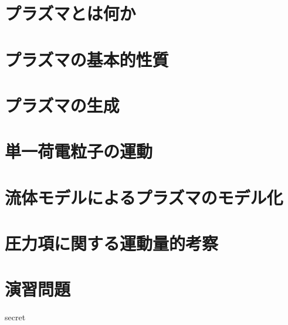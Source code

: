 \documentclass{report}
\begin{document}
  \maketitle
  \tableofcontents
  \setcounter{chapter}{-1}
  \chapter{プラズマとは何か}
    
  \chapter{プラズマの基本的性質}
    
  \chapter{プラズマの生成}
    
  \chapter{単一荷電粒子の運動}
    
  \chapter{流体モデルによるプラズマのモデル化}
    
  \appendix
    \chapter{圧力項に関する運動量的考察}
      
    \chapter{演習問題}
      secret
  \printindex
\end{document}
